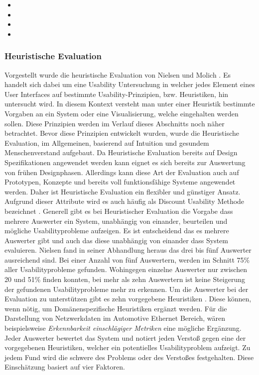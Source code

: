 \documentclass[draft=false
              ,paper=a4
              ,twoside=false
              ,fontsize=11pt
              ,headsepline
              ,BCOR10mm
              ,DIV11
              ]{scrbook}
\begin{document}
\begin{itemize}
  \item {}
  \item {}
  \item {}
  \item {}
\end{itemize}

\subsubsection{Heuristische Evaluation} %
\label{ssub:heuristische_evaluation}
Vorgestellt wurde die heuristische Evaluation von Nielsen und Molich \cite{nielsen_heuristic_1990}. Es handelt sich dabei um eine Usability Untersuchung in welcher jedes Element eines User Interfaces auf bestimmte Usability-Prinzipien, bzw. Heuristiken, hin untersucht wird. In diesem Kontext versteht man unter einer Heuristik bestimmte Vorgaben an ein System oder eine Visualisierung, welche eingehalten werden sollen. Diese Prinzipien werden im Verlauf dieses Abschnitts noch näher betrachtet. Bevor diese Prinzipien entwickelt wurden, wurde die Heuristische Evaluation, im Allgemeinen, basierend auf Intuition und gesundem Menschenverstand aufgebaut. Da Heuristische Evaluation bereits auf Design Spezifikationen angewendet werden kann eignet es sich bereits zur Auswertung von frühen Designphasen. Allerdings kann diese Art der Evaluation auch auf Prototypen, Konzepte und bereits voll funktionsfähige Systeme angewendet werden. Daher ist Heuristische Evaluation ein flexibler und günstiger Ansatz. Aufgrund dieser Attribute wird es auch häufig als Discount Usability Methode bezeichnet \cite{kane_finding_2003}\cite{nielsen_usability_1994}.
Generell gibt es bei Heuristischer Evaluation die Vorgabe dass mehrere Auswerter ein System, unabhängig von einander, beurteilen und mögliche Usabilityprobleme aufzeigen. Es ist entscheidend das es mehrere Auswerter gibt und auch das diese unabhängig von einander dass System evaluieren. Nielsen fand in seiner Abhandlung heraus das drei bis fünf Auswerter ausreichend sind. Bei einer Anzahl von fünf Auswertern, werden im Schnitt 75\% aller Usabilityprobleme gefunden. Wohingegen einzelne Auswerter nur zwischen 20 und 51\% finden konnten, bei mehr als zehn Auswertern ist keine Steigerung der gefundenen Usabilityprobleme mehr zu erkennen.
Um die Auswerter bei der Evaluation zu unterstützen gibt es zehn vorgegebene Heuristiken \cite{nielsen_usability_1994}. Diese können, wenn nötig, um Domänenspezifische Heuristiken ergänzt werden. Für die Darstellung von Netzwerkdaten im Automotive Ethernet Bereich, wären beispielsweise \textit{Erkennbarkeit einschlägiger Metriken} eine mögliche Ergänzung. 
Jeder Auswerter bewertet das System und notiert jeden Verstoß gegen eine der vorgegebenen Heuristiken, welcher ein potentielles Usabilityproblem aufzeigt. Zu jedem Fund wird die schwere des Problems oder des Verstoßes festgehalten. Diese Einschätzung basiert auf vier Faktoren.
\end{document}
